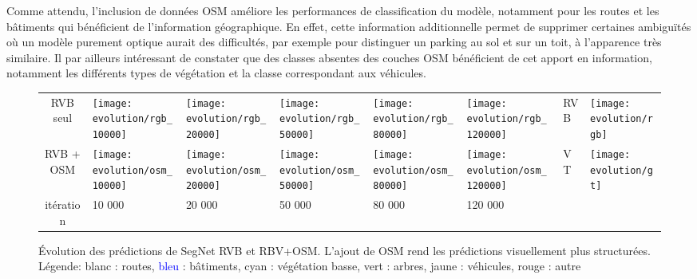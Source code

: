 Comme attendu, l'inclusion de données OSM améliore les performances de classification du modèle, notamment pour les routes et les bâtiments qui bénéficient de l'information géographique. En effet, cette information additionnelle permet de supprimer certaines ambiguïtés où un modèle purement optique aurait des difficultés, par exemple pour distinguer un parking au sol et sur un toit, à l'apparence très similaire. Il par ailleurs intéressant de constater que des classes absentes des couches \gls{OSM} bénéficient de cet apport en information, notamment les différents types de végétation et la classe correspondant aux véhicules.

\begin{figure}
\centering
\begin{tabularx}{0.95\textwidth}{c Y Y Y Y Y Y Y}
RVB seul &
\texttt{[image: evolution/rgb\_10000]} &
\texttt{[image: evolution/rgb\_20000]} &
\texttt{[image: evolution/rgb\_50000]} &
\texttt{[image: evolution/rgb\_80000]} &
\texttt{[image: evolution/rgb\_120000]} &
RVB &
\texttt{[image: evolution/rgb]} \\
RVB + OSM &
\texttt{[image: evolution/osm\_10000]} &
\texttt{[image: evolution/osm\_20000]} &
\texttt{[image: evolution/osm\_50000]} &
\texttt{[image: evolution/osm\_80000]} &
\texttt{[image: evolution/osm\_120000]} &
VT &
\texttt{[image: evolution/gt]} \\
itération & 10 000 & 20 000 & 50 000 & 80 000 & 120 000\\
\end{tabularx}
\caption{Évolution des prédictions de SegNet RVB et RBV+OSM. L'ajout de OSM rend les prédictions visuellement plus structurées.
\small{Légende: blanc : routes, \textcolor{Blue}{bleu} : bâtiments, \textcolor{Cerulean}{cyan} : végétation basse, \textcolor{OliveGreen}{vert} : arbres, \textcolor{Dandelion}{jaune} : véhicules, \textcolor{BrickRed}{rouge} : autre}}
\label{fig:training_evolution}
\end{figure}

